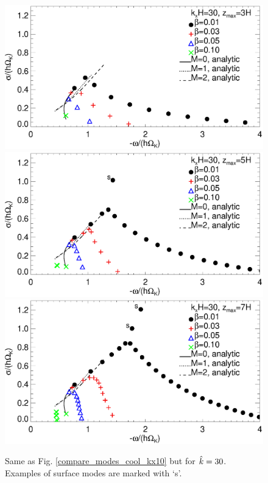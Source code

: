 \begin{figure}
  \includegraphics[width=\linewidth,clip=true,trim=0cm 1.75cm 0cm
  0cm]{figures/compare_modes_cool_kx30_z3_analytic.ps} 
  \includegraphics[width=\linewidth,clip=true,trim=0cm 1.75cm 0cm
  0cm]{figures/compare_modes_cool_kx30_z5_analytic.ps}
  \includegraphics[width=\linewidth]{figures/compare_modes_cool_kx30_z7_analytic.ps}
  \caption{Same as Fig. \ref{compare_modes_cool_kx10} but for
    $\hat{k}=30$. Examples of surface modes are marked with `s'. 
    \label{compare_modes_cool_kx30} 
  }
\end{figure}

